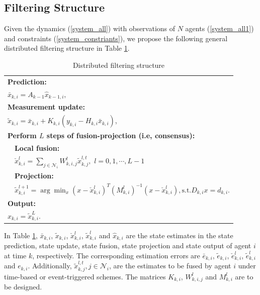 \documentclass[journal,transmag]{IEEEtran}
\begin{document}
	
	
	\subsection{Filtering Structure}
	
	Given the dynamics (\ref{system_all}) with observations of $N$ agents (\ref{system_all1}) and constraints (\ref{system_constriants}), we propose the following general distributed filtering structure in Table \ref{filter_stru}.


	\begin{table}[htbp]
		\caption{Distributed filtering structure}
		\label{filter_stru}	
		\centering  %
		\begin{tabular}{l}  %
			\hline\hline
			\textbf{Prediction:}\\
			$\bar x_{k,i}=A_{k-1}\hat x_{k-1,i},$\\
			\textbf{Measurement update:}\\	
			$\tilde x_{k,i}=\bar x_{k,i}+K_{k,i}(y_{k,i}-H_{k,i}\bar x_{k,i})$,  \\
			{\textbf{Perform $L$ steps of fusion-projection (i.e, consensus):}}\\
			{$\quad$\textbf{Local fusion:} }\\
			{$\quad$$\check  x_{k,i}^l=\sum_{j\in \mathcal{N}_{i}}W_{k,i,j}^l\tilde x_{k,j}^{l,t},$ $l=0,1,\cdots,L-1$}\\  %
			$\quad$\textbf{Projection:}\\
			{$\quad$$\tilde x_{k,i}^{l+1}=\arg\min_{x}(x-\check  x_{k,i}^l)^T(M_{k,i}^l)^{-1}(x-\check  x_{k,i}^l), \text{s.t.} D_{k,i}x=d_{k,i}.$}\\        %
	\textbf{Output:}\\	
	$\hat x_{k,i}=\tilde x_{k,i}^L$.	\\		
			\hline
		\end{tabular}
	\end{table}
	{In Table \ref{filter_stru}, $\bar x_{k,i}$, $\tilde x_{k,i}$, $\check x_{k,i}^l$,  $\tilde x_{k,i}^l$   and $\hat x_{k,i}$ are the state estimates in the state prediction,  state update,  state fusion, state projection and state output  of agent $i$ at time $k$, respectively.
		The corresponding estimation errors are $\bar e_{k,i}$, $\tilde e_{k,i}$, $\check e_{k,i}^l$,  $\tilde e_{k,i}^l$   and $e_{k,i}$.  Additionally, $\tilde x_{k,j}^{l,t},j\in\mathcal{N}_i$, are the estimates to be fused by agent $i$ under time-based or event-triggered schemes. The matrices $K_{k,i}$, $W_{k,i,j}^l$ and $M_{k,i}^l$ are to be designed.}
	
\end{document}
